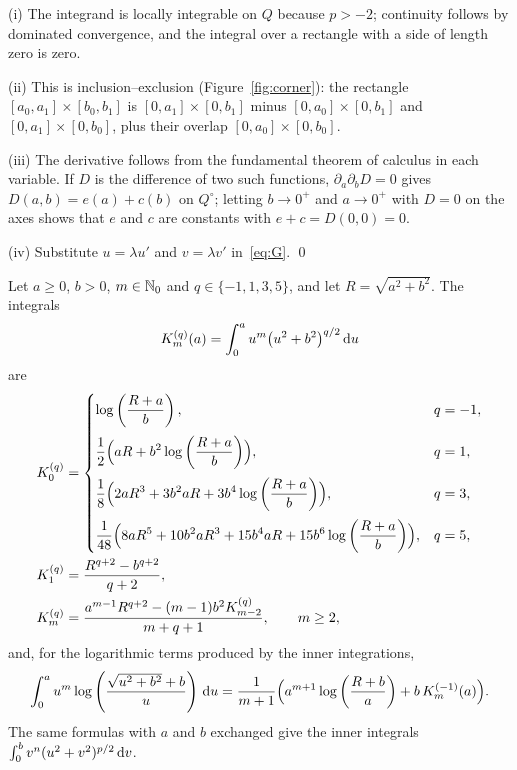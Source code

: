 \vspace{\baselineskip}
\proof
(i) The integrand is locally integrable on $Q$ because $p>-2$; continuity follows by dominated convergence, and the
integral over a rectangle with a side of length zero is zero.

(ii) This is inclusion--exclusion (Figure~\ref{fig:corner}): the rectangle $[a_0,a_1]\times[b_0,b_1]$ is
$[0,a_1]\times[0,b_1]$ minus $[0,a_0]\times[0,b_1]$ and $[0,a_1]\times[0,b_0]$, plus their overlap
$[0,a_0]\times[0,b_0]$.

(iii) The derivative follows from the fundamental theorem of calculus in each variable. If $D$ is the difference of two
such functions, $\partial_a\partial_bD=0$ gives $D(a,b)=e(a)+c(b)$ on $Q^\circ$; letting $b\to0^+$ and $a\to0^+$ with
$D=0$ on the axes shows that $e$ and $c$ are constants with $e+c=D(0,0)=0$.

(iv) Substitute $u=\lambda u'$ and $v=\lambda v'$ in~\eqref{eq:G}. \qed

 Let $a\ge0$, $b>0$, $m\in\mathbb{N}_0$ and $q\in\{-1,1,3,5\}$, and let $R=\sqrt{a^2+b^2}$. The integrals
\begin{equation}
    K^{(q)}_m(a)=\int_0^a u^m\bigl(u^2+b^2\bigr)^{q/2}\,\mathrm{d} u
\end{equation}
are
\begin{align}
    K^{(q)}_0 &= \begin{dcases}
        \log\left(\frac{R+a}{b}\right), & q=-1,\\[2pt]
        \frac12\Bigl(aR+b^2\log\left(\frac{R+a}{b}\right)\Bigr), & q=1,\\[2pt]
        \frac18\Bigl(2aR^3+3b^2aR+3b^4\log\left(\frac{R+a}{b}\right)\Bigr), & q=3,\\[2pt]
        \frac{1}{48}\Bigl(8aR^5+10b^2aR^3+15b^4aR+15b^6\log\left(\frac{R+a}{b}\right)\Bigr), & q=5,
    \end{dcases}\label{eq:K0}\\
    K^{(q)}_1 &= \frac{R^{q+2}-b^{q+2}}{q+2}, \label{eq:K1}\\
    K^{(q)}_m &= \frac{a^{m-1}R^{q+2}-(m-1)b^2K^{(q)}_{m-2}}{m+q+1}, \qquad m\ge2, \label{eq:Kk}
\end{align}
and, for the logarithmic terms produced by the inner integrations,
\begin{equation}
    \label{eq:ibp}
    \int_0^a u^m\log\left(\frac{\sqrt{u^2+b^2}+b}{u}\right)\,\mathrm{d} u = \frac{1}{m+1}\Bigl(a^{m+1}\log\left(\frac{R+b}{a}\right) + b\,K^{(-1)}_m(a)\Bigr).
\end{equation}
The same formulas with $a$ and $b$ exchanged give the inner integrals $\int_0^b v^n(u^2+v^2)^{p/2}\,\mathrm{d} v$.

